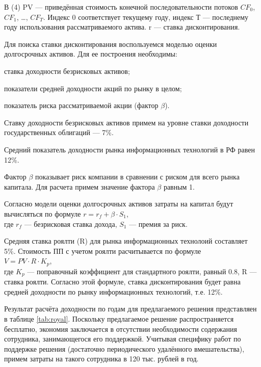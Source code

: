 В (4) PV --- приведённая стоимость конечной последовательности потоков $CF_0$, $CF_1$, \ldots , $CF_T$. Индекс 0 соответствует текущему году, индекс Т --- последнему году использования рассматриваемого актива. r --- ставка дисконтирования.

Для поиска ставки дисконтирования воспользуемся моделью оценки долгосрочных активов. Для ее построения необходимы:
\begin{list}{}{\leftmargin=1.5cm}
	\item ставка доходности безрисковых активов;
	\item показатели средней доходности акций по рынку в целом;
	\item показатель риска рассматриваемой акции (фактор $\beta$).
\end{list}

Ставку доходности безрисковых активов примем на уровне ставки доходности государственных облигаций --- 7\%.

Средний показатель доходности рынка информационных технологий в РФ равен 12\%.

Фактор $\beta$ показывает риск компании в сравнении с риском для всего рынка капитала. Для расчета примем значение фактора $\beta$ равным 1.

Согласно модели оценки долгосрочных активов затраты на капитал будут вычисляться по формуле $r = r_f + \beta\cdot S_1$,\\ где $r_f$ --- безрисковая ставка дохода, $S_1$ --- премия за риск.

Средняя ставка роялти (R) для рынка информационных технолоий составляет 5\%. Стоимость ПП с учетом роялти расчитывается по формуле\\ $V = PV \cdot R \cdot K_p$,\\ где $K_p$ --- поправочный коэффициент для стандартного роялти, равный 0.8, R --- ставка роялти. Согласно этой формуле, ставка дисконтирования будет равна средней доходности по рынку информационных технологий, т.е. 12\%.

Результат расчёта доходности по годам для предлагаемого решения представляен в таблице \ref{tab:royal}. Поскольку предлагаемое решение распространяется бесплатно, экономия заключается в отсутствии необходимости содержания сотрудника, занимающегося его поддержкой. Учитывая специфику работ по поддержке решения (достаточно периодического удалённого вмешательства), примем затраты на такого сотрудника в 120 тыс. рублей в год.

